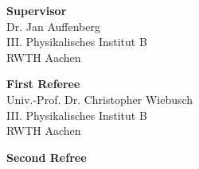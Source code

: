 \cleardoublepage

\vspace*{17cm}

\begin{flushleft}
	\textbf{Supervisor}\\
	Dr. Jan Auffenberg\\
	III. Physikalisches Institut B\\
	RWTH Aachen\\
	\bigskip
	
	\textbf{First Referee}\\
	Univ.-Prof. Dr. Christopher Wiebusch\\
	III. Physikalisches Institut B\\
	RWTH Aachen\\
	\bigskip
	
	\textbf{Second Refree}\\
	
\end{flushleft}